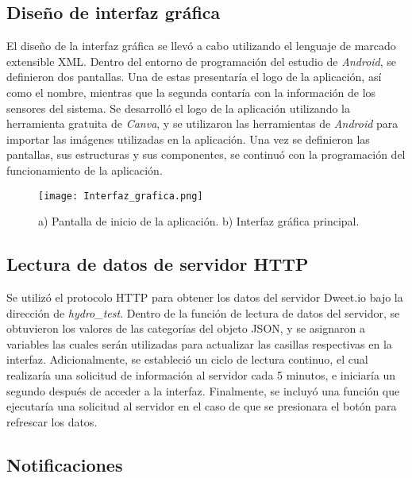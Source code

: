 \subsection{Diseño de interfaz gráfica}

El diseño de la interfaz gráfica se llevó a cabo utilizando el lenguaje de marcado extensible XML. Dentro del entorno de programación del estudio de \textit{Android}, se definieron dos pantallas. Una de estas presentaría el logo de la aplicación, así como el nombre, mientras que la segunda contaría con la información de los sensores del sistema. Se desarrolló el logo de la aplicación utilizando la herramienta gratuita de \textit{Canva}, y se utilizaron las herramientas de \textit{Android} para importar las imágenes utilizadas en la aplicación. Una vez se definieron las pantallas, sus estructuras y sus componentes, se continuó con la programación del funcionamiento de la aplicación.

\begin{figure}[H]
	\centering
	\texttt{[image: Interfaz\_grafica.png]}
	\caption{a) Pantalla de inicio de la aplicación. b) Interfaz gráfica principal.}
	\label{fig:interfaz_graf}
\end{figure}

\subsection{Lectura de datos de servidor HTTP}

Se utilizó el protocolo HTTP para obtener los datos del servidor Dweet.io bajo la dirección de \textit{hydro\_test}. Dentro de la función de lectura de datos del servidor, se obtuvieron los valores de las categorías del objeto JSON, y se asignaron a variables las cuales serán utilizadas para actualizar las casillas respectivas en la interfaz. Adicionalmente, se estableció un ciclo de lectura continuo, el cual realizaría una solicitud de información al servidor cada 5 minutos, e iniciaría un segundo después de acceder a la interfaz. Finalmente, se incluyó una función que ejecutaría una solicitud al servidor en el caso de que se presionara el botón para refrescar los datos.

\subsection{Notificaciones}					%


